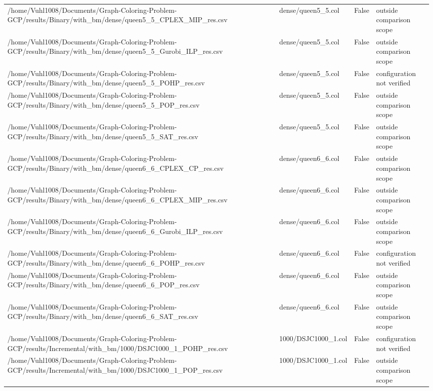 \begin{table}[htbp]
\begin{tabular}{llll}
/home/Vuhl1008/Documents/Graph-Coloring-Problem-GCP/results/Binary/with\_bm/dense/queen5\_5\_CPLEX\_MIP\_res.csv & dense/queen5\_5.col & False & outside comparison scope \\
/home/Vuhl1008/Documents/Graph-Coloring-Problem-GCP/results/Binary/with\_bm/dense/queen5\_5\_Gurobi\_ILP\_res.csv & dense/queen5\_5.col & False & outside comparison scope \\
/home/Vuhl1008/Documents/Graph-Coloring-Problem-GCP/results/Binary/with\_bm/dense/queen5\_5\_POHP\_res.csv & dense/queen5\_5.col & False & configuration not verified \\
/home/Vuhl1008/Documents/Graph-Coloring-Problem-GCP/results/Binary/with\_bm/dense/queen5\_5\_POP\_res.csv & dense/queen5\_5.col & False & outside comparison scope \\
/home/Vuhl1008/Documents/Graph-Coloring-Problem-GCP/results/Binary/with\_bm/dense/queen5\_5\_SAT\_res.csv & dense/queen5\_5.col & False & outside comparison scope \\
/home/Vuhl1008/Documents/Graph-Coloring-Problem-GCP/results/Binary/with\_bm/dense/queen6\_6\_CPLEX\_CP\_res.csv & dense/queen6\_6.col & False & outside comparison scope \\
/home/Vuhl1008/Documents/Graph-Coloring-Problem-GCP/results/Binary/with\_bm/dense/queen6\_6\_CPLEX\_MIP\_res.csv & dense/queen6\_6.col & False & outside comparison scope \\
/home/Vuhl1008/Documents/Graph-Coloring-Problem-GCP/results/Binary/with\_bm/dense/queen6\_6\_Gurobi\_ILP\_res.csv & dense/queen6\_6.col & False & outside comparison scope \\
/home/Vuhl1008/Documents/Graph-Coloring-Problem-GCP/results/Binary/with\_bm/dense/queen6\_6\_POHP\_res.csv & dense/queen6\_6.col & False & configuration not verified \\
/home/Vuhl1008/Documents/Graph-Coloring-Problem-GCP/results/Binary/with\_bm/dense/queen6\_6\_POP\_res.csv & dense/queen6\_6.col & False & outside comparison scope \\
/home/Vuhl1008/Documents/Graph-Coloring-Problem-GCP/results/Binary/with\_bm/dense/queen6\_6\_SAT\_res.csv & dense/queen6\_6.col & False & outside comparison scope \\
/home/Vuhl1008/Documents/Graph-Coloring-Problem-GCP/results/Incremental/with\_bm/1000/DSJC1000\_1\_POHP\_res.csv & 1000/DSJC1000\_1.col & False & configuration not verified \\
/home/Vuhl1008/Documents/Graph-Coloring-Problem-GCP/results/Incremental/with\_bm/1000/DSJC1000\_1\_POP\_res.csv & 1000/DSJC1000\_1.col & False & outside comparison scope \\

\end{tabular}
\end{table}
